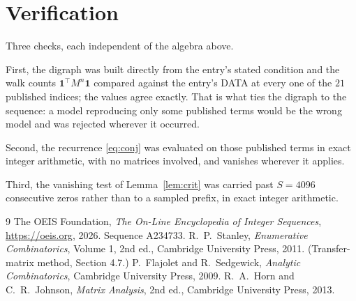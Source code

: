 \documentclass[11pt,a4paper]{article}
\theoremstyle{plain}
\theoremstyle{definition}
\begin{document}
\section{Verification}

Three checks, each independent of the algebra above.

First, the digraph was built directly from the entry's stated condition and the walk counts
$\mathbf{1}^{\!\top}M^{n}\mathbf{1}$ compared against the entry's DATA at every one of
the $21$ published indices; the values agree exactly. That is what ties the digraph to
the sequence: a model reproducing only some published terms would be the wrong model and
was rejected wherever it occurred.

Second, the recurrence \eqref{eq:conj} was evaluated on those published terms in exact
integer arithmetic, with no matrices involved, and vanishes wherever it applies.

Third, the vanishing test of Lemma~\ref{lem:crit} was carried past $S=4096$ consecutive
zeros rather than to a sampled prefix, in exact integer arithmetic.

\begin{thebibliography}{9}
 The OEIS Foundation, \emph{The On-Line Encyclopedia of Integer
Sequences}, \url{https://oeis.org}, 2026. Sequence A234733.
 R.~P.~Stanley, \emph{Enumerative Combinatorics}, Volume 1, 2nd ed.,
Cambridge University Press, 2011. (Transfer-matrix method, Section 4.7.)
 P.~Flajolet and R.~Sedgewick, \emph{Analytic Combinatorics}, Cambridge
University Press, 2009.
 R.~A.~Horn and C.~R.~Johnson, \emph{Matrix Analysis}, 2nd ed., Cambridge
University Press, 2013.
\end{thebibliography}
\end{document}
